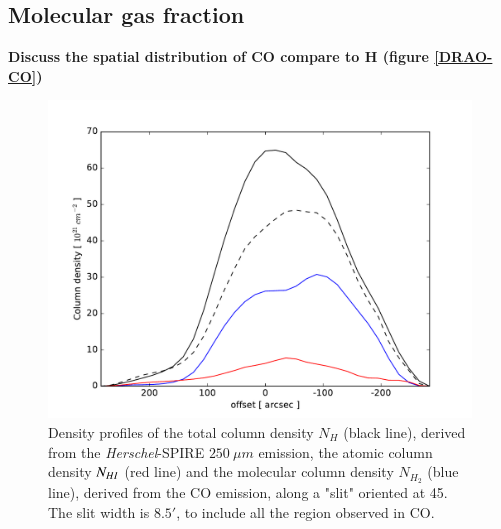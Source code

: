 \documentclass[traditabstract]{aa}
\begin{document}
\subsection{Molecular gas fraction}

\textbf{Discuss the spatial distribution of CO compare to H (figure \ref{DRAO-CO})}

\begin{figure}[h!]
  \centering
  \includegraphics[width=\linewidth,trim=30 10 55 35,clip=true]{Figures/Column_density_profiles.pdf}
  \caption{\label{Col_density} Density profiles of the total column density $N_H$ (black line), derived from the \emph{Herschel}-SPIRE $250\: \mu m$ emission, the atomic column density $N_{H\rmnum{1}}$ (red line) and the molecular column density $N_{H_2}$ (blue line), derived from the CO emission, along a "slit" oriented at 45\degree. The slit width is $8.5'$, to include all the region observed in CO.}
\end{figure}
\end{document}
